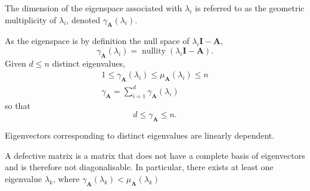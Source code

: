 \documentclass{article}
\DeclareMathOperator*{\nullity}{nullity}
\begin{document}
\begin{definition}
    The dimension of the eigenspace associated with \(\lambda_i\) is referred to as the
    geometric multiplicity of \(\lambda_i\), denoted \(\gamma_{\symbf{A}}\left( \lambda_i \right)\).

    As the eigenspace is by definition the
    null space of \(\lambda_i \symbf{I} - \symbf{A}\),
    \begin{equation*}
        \gamma_{\symbf{A}} \left( \lambda_i \right) = \nullity{\left( \lambda_i \symbf{I} - \symbf{A} \right)}.
    \end{equation*}
    Given \(d \leq n\) distinct eigenvalues,
    \begin{gather*}
        1 \leq \gamma_{\symbf{A}}\left( \lambda_i \right) \leq \mu_{\symbf{A}}\left( \lambda_i \right) \leq n \\
        \gamma_{\symbf{A}} = \sum_{i = 1}^d \gamma_{\symbf{A}} \left( \lambda_i \right)
    \end{gather*}
    so that
    \begin{equation*}
        d \leq \gamma_{\symbf{A}} \leq n.
    \end{equation*}
\end{definition}
\begin{theorem}
    Eigenvectors corresponding to distinct eigenvalues are linearly dependent.
\end{theorem}
\begin{definition}
    A defective matrix is a matrix that does not have a complete basis of eigenvectors and is therefore not diagonalisable.
    In particular, there exists at least one eigenvalue \(\lambda_k\),
    where \(\gamma_{\symbf{A}}\left( \lambda_k \right) < \mu_{\symbf{A}}\left( \lambda_k \right)\)
\end{definition}
\end{document}
